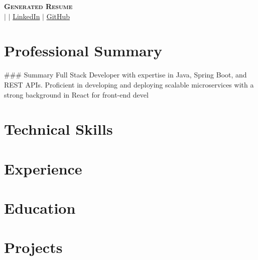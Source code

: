 \documentclass[letterpaper,11pt]{article}
\newcommand{\resumeSubHeadingListStart}{\begin{itemize}[leftmargin=0.15in, label={}]}
\newcommand{\resumeSubHeadingListEnd}{\end{itemize}}
\begin{document}
\begin{center}
    \textbf{\Huge \scshape Generated Resume} \\ \vspace{1pt}
    \small  $|$ \href{mailto:}{} $|$ 
    \href{}{LinkedIn} $|$
    \href{}{GitHub}
\end{center}

\section{Professional Summary}
\small{\#\#\# Summary
Full Stack Developer with expertise in Java, Spring Boot, and REST APIs. Proficient in developing and deploying scalable microservices with a strong background in React for front-end devel}

\section{Technical Skills}
 \begin{itemize}[leftmargin=0.15in, label={}]
    \small{\item{
     
    }}
 \end{itemize}

\section{Experience}
  \resumeSubHeadingListStart
    
  \resumeSubHeadingListEnd

\section{Education}
  \resumeSubHeadingListStart
    
  \resumeSubHeadingListEnd

\section{Projects}
    \resumeSubHeadingListStart
      
    \resumeSubHeadingListEnd

\end{document}

